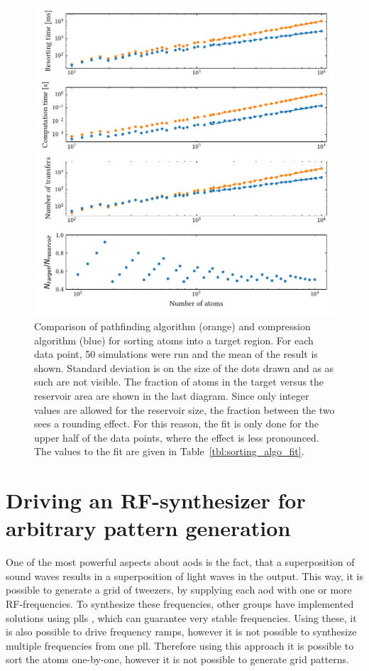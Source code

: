 \begin{figure}[h]
\label{fig:sorting_algos}
\centering
	\includegraphics{figures/sorting_algos_155.pdf}
	\caption{Comparison of pathfinding algorithm (orange) and compression algorithm (blue) for sorting atoms into a target region. For each data point, 50 simulations were run and the mean of the result is shown. Standard deviation is on the size of the dots drawn and as as such are not visible. The fraction of atoms in the target versus the reservoir area are shown in the last diagram. Since only integer values are allowed for the reservoir size, the fraction between the two sees a rounding effect. For this reason, the fit is only done for the upper half of the data points, where the effect is less pronounced. The values to the fit are given in Table~\ref{tbl:sorting_algo_fit}.}
\end{figure}

\section{Driving an RF-synthesizer for arbitrary pattern generation}

One of the most powerful aspects about \acp{aod} is the fact, that a superposition of sound waves results in a superposition of light waves in the output. This way, it is possible to generate a grid of tweezers, by supplying each \ac{aod} with one or more RF-frequencies. To synthesize these frequencies, other groups have implemented solutions using \acp{pll} , which can guarantee very stable frequencies. Using these, it is also possible to drive frequency ramps, however it is not possible to synthesize multiple frequencies from one \ac{pll}. Therefore using this approach it is possible to sort the atoms one-by-one, however it is not possible to generate grid patterns.

